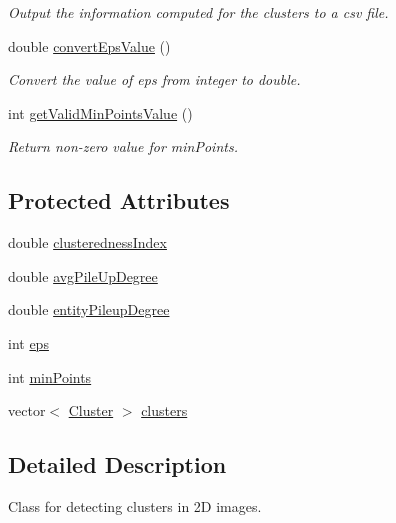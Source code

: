 \begin{DoxyCompactItemize}
\begin{DoxyCompactList}\small\item\em Output the information computed for the clusters to a csv file. \end{DoxyCompactList}\item 
double \hyperlink{classmultiscale_1_1analysis_1_1ClusterDetector_afccb86bfb93df00fff8408faea7a2651}{convert\-Eps\-Value} ()
\begin{DoxyCompactList}\small\item\em Convert the value of eps from integer to double. \end{DoxyCompactList}\item 
int \hyperlink{classmultiscale_1_1analysis_1_1ClusterDetector_ab1c2514fb8599f74bf010e81154a9bf7}{get\-Valid\-Min\-Points\-Value} ()
\begin{DoxyCompactList}\small\item\em Return non-\/zero value for min\-Points. \end{DoxyCompactList}\end{DoxyCompactItemize}
\subsection*{Protected Attributes}
\begin{DoxyCompactItemize}
\item 
double \hyperlink{classmultiscale_1_1analysis_1_1ClusterDetector_a5e2bf77041bd0d5047dd16c4632c16b7}{clusteredness\-Index}
\item 
double \hyperlink{classmultiscale_1_1analysis_1_1ClusterDetector_a6f6cfa50cf21ac400d41d6c6f2112bc9}{avg\-Pile\-Up\-Degree}
\item 
double \hyperlink{classmultiscale_1_1analysis_1_1ClusterDetector_aaa93a4b3a5a3c4279aa434669093ac40}{entity\-Pileup\-Degree}
\item 
int \hyperlink{classmultiscale_1_1analysis_1_1ClusterDetector_a61e876f87d62245eada8f56d587d39cd}{eps}
\item 
int \hyperlink{classmultiscale_1_1analysis_1_1ClusterDetector_aa94df1adc462be5931ec25ba24122fe9}{min\-Points}
\item 
vector$<$ \hyperlink{classmultiscale_1_1analysis_1_1Cluster}{Cluster} $>$ \hyperlink{classmultiscale_1_1analysis_1_1ClusterDetector_aa81a8649bc743389c2fc1919d47eb5b3}{clusters}
\end{DoxyCompactItemize}


\subsection{Detailed Description}
Class for detecting clusters in 2\-D images. 

